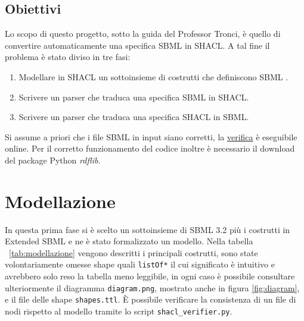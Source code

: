 \documentclass{article}
\begin{document}
\subsection{Obiettivi}

Lo scopo di questo progetto, sotto la guida del Professor Tronci, è quello di convertire automaticamente una specifica SBML in SHACL. A tal fine il problema è stato diviso in tre fasi:

\begin{enumerate}
    \item Modellare in SHACL un sottoinsieme di costrutti che definiscono SBML . 
    \item Scrivere un parser che traduca una specifica SBML in SHACL.
    \item Scrivere un parser che traduca una specifica SHACL in SBML.
\end{enumerate}

Si assume a priori che i file SBML in input siano corretti, la \href{http://sbml.org/Facilities/Validator}{verifica} è eseguibile online. Per il corretto funzionamento del codice inoltre è necessario il download del package Python \textit{rdflib}.

\clearpage
\section{Modellazione}

In questa prima fase si è scelto un sottoinsieme di SBML 3.2 più i costrutti in Extended SBML e ne è stato formalizzato un modello. Nella tabella ~\ref{tab:modellazione} vengono descritti i principali costrutti, sono state volontariamente omesse shape quali \texttt{listOf*} il cui significato è intuitivo e avrebbero solo reso la tabella meno leggibile, in ogni caso è possibile consultare ulteriormente il diagramma \texttt{diagram.png}, mostrato anche in figura \ref{fig:diagram}, e il file delle shape \texttt{shapes.ttl}. È possibile verificare la consistenza di un file di nodi rispetto al modello tramite lo script \texttt{shacl\_verifier.py}.
\end{document}
